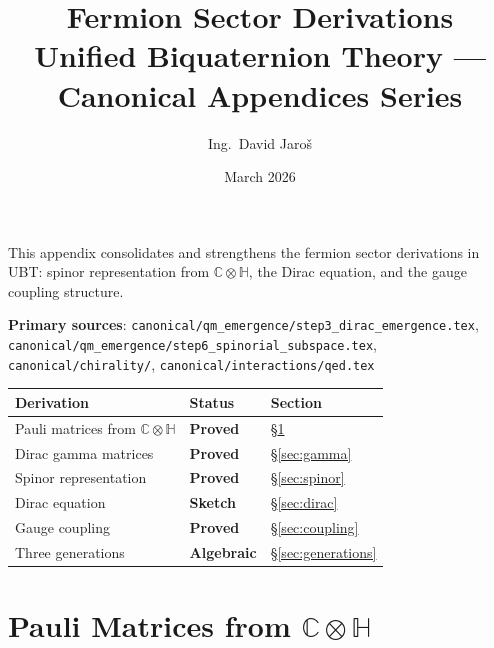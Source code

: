 \documentclass[11pt,a4paper]{article}
\title{\textbf{Fermion Sector Derivations}\\
\large Unified Biquaternion Theory — Canonical Appendices Series}
\author{Ing.\ David Jaroš}
\date{March 2026}
\theoremstyle{definition}
\theoremstyle{remark}
\begin{document}
\maketitle
\tableofcontents
\bigskip

\begin{tcolorbox}[colback=blue!4!white,colframe=blue!50!black,title=Purpose]
This appendix consolidates and strengthens the fermion sector derivations in UBT:
spinor representation from $\mathbb{C}\otimes\mathbb{H}$, the Dirac equation,
and the gauge coupling structure.

\medskip
\textbf{Primary sources}:
\texttt{canonical/qm\_emergence/step3\_dirac\_emergence.tex},
\texttt{canonical/qm\_emergence/step6\_spinorial\_subspace.tex},
\texttt{canonical/chirality/},
\texttt{canonical/interactions/qed.tex}

\medskip
\begin{tabular}{lll}
\hline
Derivation & Status & Section \\
\hline
Pauli matrices from $\mathbb{C}\otimes\mathbb{H}$ & \textbf{Proved} & \S\ref{sec:pauli} \\
Dirac gamma matrices & \textbf{Proved} & \S\ref{sec:gamma} \\
Spinor representation & \textbf{Proved} & \S\ref{sec:spinor} \\
Dirac equation & \textbf{Sketch} & \S\ref{sec:dirac} \\
Gauge coupling & \textbf{Proved} & \S\ref{sec:coupling} \\
Three generations & \textbf{Algebraic} & \S\ref{sec:generations} \\
\hline
\end{tabular}
\end{tcolorbox}

\section{Pauli Matrices from $\mathbb{C}\otimes\mathbb{H}$}\label{sec:pauli}
\end{document}
